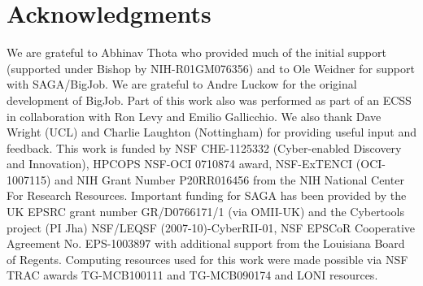 \documentclass{sig-alternate}
\begin{document}
\section{Acknowledgments}
We are grateful to Abhinav Thota who provided much of the initial
support (supported under Bishop by NIH-R01GM076356) and 
to Ole Weidner for support with SAGA/BigJob. We
are grateful to Andre Luckow for the original development of
BigJob. Part of this work also was performed as part of an ECSS in
collaboration with Ron Levy and Emilio Gallicchio. We also thank Dave
Wright (UCL) and Charlie Laughton (Nottingham) for providing useful
input and feedback.  This work is funded by NSF CHE-1125332
(Cyber-enabled Discovery and Innovation), HPCOPS NSF-OCI 0710874
award, NSF-ExTENCI (OCI-1007115) and NIH Grant Number P20RR016456 from
the NIH National Center For Research Resources. Important funding for
SAGA has been provided by the UK EPSRC grant number GR/D0766171/1 (via
OMII-UK) and the Cybertools project (PI Jha) NSF/LEQSF
(2007-10)-CyberRII-01, NSF EPSCoR Cooperative Agreement
No. EPS-1003897 with additional support from the Louisiana Board of
Regents.  Computing resources used for this work were made possible
via NSF TRAC awards TG-MCB100111 and TG-MCB090174 and LONI resources.






\end{document}

